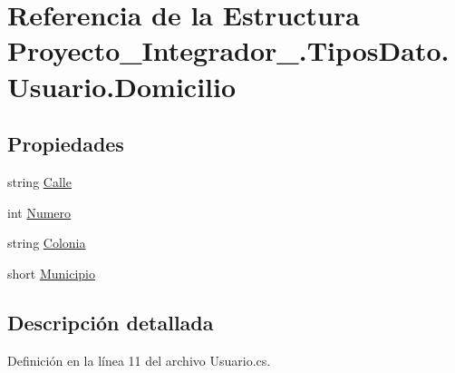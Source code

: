 \hypertarget{struct_proyecto___integrador__3_1_1_tipos_dato_1_1_usuario_1_1_domicilio}{\section{Referencia de la Estructura Proyecto\-\_\-\-Integrador\-\_.\-Tipos\-Dato.\-Usuario.\-Domicilio}
\label{struct_proyecto___integrador__3_1_1_tipos_dato_1_1_usuario_1_1_domicilio}
}
\subsection*{Propiedades}
\begin{DoxyCompactItemize}
\item 
string \hyperlink{struct_proyecto___integrador__3_1_1_tipos_dato_1_1_usuario_1_1_domicilio_ac7f639c760a904e006a4ea6a3db05dff}{Calle}
\item 
int \hyperlink{struct_proyecto___integrador__3_1_1_tipos_dato_1_1_usuario_1_1_domicilio_a31d02de9239bc44c3da8022fc36419e1}{Numero}
\item 
string \hyperlink{struct_proyecto___integrador__3_1_1_tipos_dato_1_1_usuario_1_1_domicilio_a0782bc382740439c8b0340518e7ad972}{Colonia}
\item 
short \hyperlink{struct_proyecto___integrador__3_1_1_tipos_dato_1_1_usuario_1_1_domicilio_a909e9dfc0615a13937e6c4134dca57c5}{Municipio}
\end{DoxyCompactItemize}


\subsection{Descripción detallada}


Definición en la línea 11 del archivo Usuario.\-cs.



